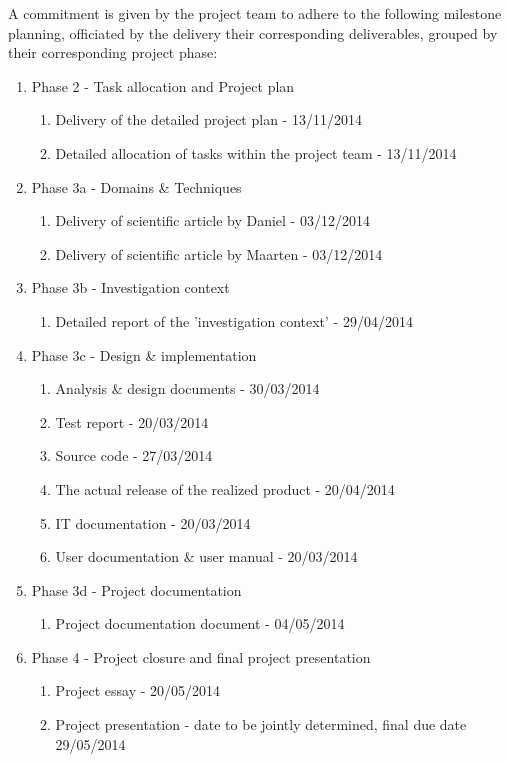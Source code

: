 A commitment is given by the project team to adhere to the following milestone planning, officiated by the delivery their corresponding deliverables, grouped by their corresponding project phase:

 \begin{enumerate}
	\item Phase 2 - Task allocation and Project plan
 	\begin{enumerate}
		\item Delivery of the detailed project plan 			-	13/11/2014
		\item Detailed allocation of tasks within the project team 	- 	13/11/2014
	\end {enumerate}
	\item Phase 3a - Domains \& Techniques
 	\begin{enumerate}
		\item Delivery of scientific article by Daniel			- 	03/12/2014
		\item Delivery of scientific article by Maarten  			- 	03/12/2014
	\end {enumerate}
 	\item Phase 3b - Investigation context
 	\begin{enumerate}
		\item Detailed report of the 'investigation context'  		- 	29/04/2014
	\end {enumerate}
 	\item Phase 3c - Design \& implementation
 	\begin{enumerate}
		\item Analysis \& design documents  				- 	30/03/2014
		\item Test report  							- 	20/03/2014
		\item Source code  							- 	27/03/2014
		\item The actual release of the realized product  		- 	20/04/2014
		\item IT documentation  						- 	20/03/2014
		\item User documentation \& user manual  			- 	20/03/2014
	\end {enumerate}
 	\item Phase 3d - Project documentation
 	\begin{enumerate}
		\item Project documentation document				- 	04/05/2014
	\end {enumerate}
	\item Phase 4 - Project closure and final project presentation
 	\begin{enumerate}
		\item Project essay							- 	20/05/2014
		\item Project presentation						- 	date to be jointly determined, final due date 29/05/2014
	\end {enumerate}
\end {enumerate}

